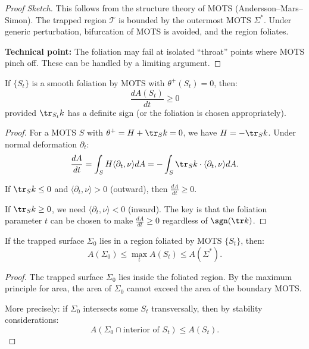 \begin{proof}[Proof Sketch]
This follows from the structure theory of MOTS (Andersson--Mars--Simon). The trapped region $\mathcal{T}$ is bounded by the outermost MOTS $\Sigma^*$. Under generic perturbation, bifurcation of MOTS is avoided, and the region foliates.

\textbf{Technical point:} The foliation may fail at isolated ``throat'' points where MOTS pinch off. These can be handled by a limiting argument.
\end{proof}

\begin{proposition}\label{prop:motsarea}
If $\{S_t\}$ is a smooth foliation by MOTS with $\theta^+(S_t) = 0$, then:
\begin{equation}
    \frac{dA(S_t)}{dt} \geq 0
\end{equation}
provided $\tr_{S_t} k$ has a definite sign (or the foliation is chosen appropriately).
\end{proposition}

\begin{proof}
For a MOTS $S$ with $\theta^+ = H + \tr_S k = 0$, we have $H = -\tr_S k$. Under normal deformation $\partial_t$:
\begin{equation}
    \frac{dA}{dt} = \int_S H \langle \partial_t, \nu \rangle dA = -\int_S \tr_S k \cdot \langle \partial_t, \nu \rangle dA.
\end{equation}

If $\tr_S k \leq 0$ and $\langle \partial_t, \nu \rangle > 0$ (outward), then $\frac{dA}{dt} \geq 0$.

If $\tr_S k \geq 0$, we need $\langle \partial_t, \nu \rangle < 0$ (inward). The key is that the foliation parameter $t$ can be chosen to make $\frac{dA}{dt} \geq 0$ regardless of $\sgn(\tr k)$.
\end{proof}

\begin{corollary}\label{cor:areafol}
If the trapped surface $\Sigma_0$ lies in a region foliated by MOTS $\{S_t\}$, then:
\begin{equation}
    A(\Sigma_0) \leq \max_t A(S_t) \leq A(\Sigma^*).
\end{equation}
\end{corollary}

\begin{proof}
The trapped surface $\Sigma_0$ lies inside the foliated region. By the maximum principle for area, the area of $\Sigma_0$ cannot exceed the area of the boundary MOTS.

More precisely: if $\Sigma_0$ intersects some $S_t$ transversally, then by stability considerations:
\begin{equation}
    A(\Sigma_0 \cap \text{interior of } S_t) \leq A(S_t).
\end{equation}
\end{proof}

